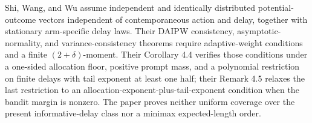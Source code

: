 Shi, Wang, and Wu assume independent and identically distributed potential-outcome vectors independent of contemporaneous action and delay, together with stationary arm-specific delay laws.  Their DAIPW consistency, asymptotic-normality, and variance-consistency theorems require adaptive-weight conditions and a finite \((2+\delta)\)-moment.  Their Corollary 4.4 verifies those conditions under a one-sided allocation floor, positive prompt mass, and a polynomial restriction on finite delays with tail exponent at least one half; their Remark 4.5 relaxes the last restriction to an allocation-exponent-plus-tail-exponent condition when the bandit margin is nonzero.  The paper proves neither uniform coverage over the present informative-delay class nor a minimax expected-length order.
